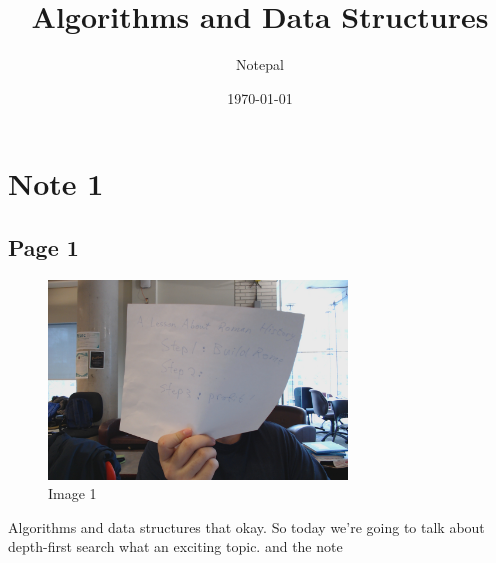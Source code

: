 \documentclass{article}%
\title{Algorithms and Data Structures}%
\author{Notepal}%
\date{\today}%
\begin{document}
%
\normalsize%
\maketitle%
\section{Note 1}%
\label{sec:Note 1}%
\subsection{Page 1}%
\label{subsec:Page 1}%


\begin{figure}[h!]%
\centering%
\includegraphics[width=300px]{../Notes/Algorithms and Data Structures/Note 1/image 1.jpg}%
\caption{Image 1}%
\end{figure}

%
Algorithms and data structures that okay. So today we're going to talk about depth{-}first search what an exciting topic. \newline%
 and the note \newline%

%
\end{document}
